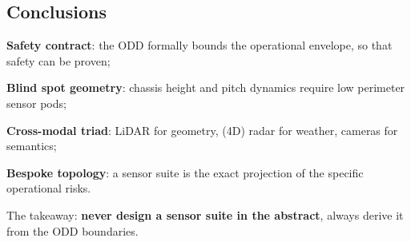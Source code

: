 \subsection{Conclusions}
\begin{compactitemize}
    \item \textbf{Safety contract}: the ODD formally bounds the operational envelope, so that safety can be proven;
    \item \textbf{Blind spot geometry}: chassis height and pitch dynamics require low perimeter sensor pods;
    \item \textbf{Cross-modal triad}: LiDAR for geometry, (4D) radar for weather, cameras for semantics;
    \item \textbf{Bespoke topology}: a sensor suite is the exact projection of the specific operational risks.
\end{compactitemize}
The takeaway: \textbf{never design a sensor suite in the abstract}, always derive it from the ODD boundaries.
